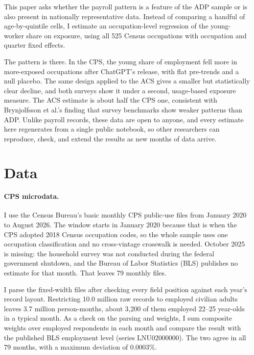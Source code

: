 \documentclass[11pt]{article}
\begin{document}
This paper asks whether the payroll pattern is a feature of the ADP sample or is also present in nationally representative data. Instead of comparing a handful of age-by-quintile cells, I estimate an occupation-level regression of the young-worker share on exposure, using all 525 Census occupations with occupation and quarter fixed effects.

The pattern is there. In the CPS, the young share of employment fell more in more-exposed occupations after ChatGPT's release, with flat pre-trends and a null placebo. The same design applied to the ACS gives a smaller but statistically clear decline, and both surveys show it under a second, usage-based exposure measure. The ACS estimate is about half the CPS one, consistent with Brynjolfsson et al.'s finding that survey benchmarks show weaker patterns than ADP. Unlike payroll records, these data are open to anyone, and every estimate here regenerates from a single public notebook, so other researchers can reproduce, check, and extend the results as new months of data arrive.

\section{Data}

\paragraph{CPS microdata.} I use the Census Bureau's basic monthly CPS public-use files from January 2020 to August 2026. The window starts in January 2020 because that is when the CPS adopted 2018 Census occupation codes, so the whole sample uses one occupation classification and no cross-vintage crosswalk is needed. October 2025 is missing: the household survey was not conducted during the federal government shutdown, and the Bureau of Labor Statistics (BLS) publishes no estimate for that month. That leaves 79 monthly files.

I parse the fixed-width files after checking every field position against each year's record layout. Restricting 10.0 million raw records to employed civilian adults leaves 3.7 million person-months, about 3,200 of them employed 22--25 year-olds in a typical month. As a check on the parsing and weights, I sum composite weights over employed respondents in each month and compare the result with the published BLS employment level (series LNU02000000). The two agree in all 79 months, with a maximum deviation of 0.0003\%.
\end{document}
